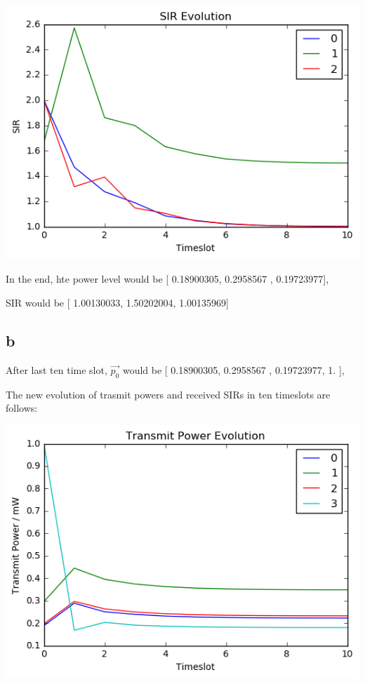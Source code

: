 \documentclass[12pt,a4paper]{article}
\begin{document}
\includegraphics[width=\textwidth]{PIC/a-2.png}

In the end, hte power level would be [ 0.18900305,  0.2958567 ,  0.19723977],

SIR would be [ 1.00130033,  1.50202004,  1.00135969]

\subsection{b}

After last ten time slot, $\vec{p_0}$ would be [ 0.18900305,  0.2958567 ,  0.19723977,  1.        ],

The new evolution of trasmit powers and received SIRs in ten timeslots are follows:



\includegraphics[width=\textwidth]{PIC/b-1.png}
\end{document}
